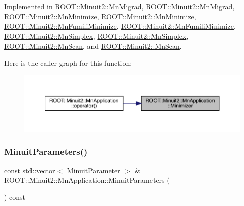 Implemented in \mbox{\hyperlink{classROOT_1_1Minuit2_1_1MnMigrad_a98fa0ce74bf180a287093ac677e8644c}{R\+O\+O\+T\+::\+Minuit2\+::\+Mn\+Migrad}}, \mbox{\hyperlink{classROOT_1_1Minuit2_1_1MnMigrad_a98fa0ce74bf180a287093ac677e8644c}{R\+O\+O\+T\+::\+Minuit2\+::\+Mn\+Migrad}}, \mbox{\hyperlink{classROOT_1_1Minuit2_1_1MnMinimize_a879bb789f98c72f9a90a327fc7bb48fd}{R\+O\+O\+T\+::\+Minuit2\+::\+Mn\+Minimize}}, \mbox{\hyperlink{classROOT_1_1Minuit2_1_1MnMinimize_a879bb789f98c72f9a90a327fc7bb48fd}{R\+O\+O\+T\+::\+Minuit2\+::\+Mn\+Minimize}}, \mbox{\hyperlink{classROOT_1_1Minuit2_1_1MnFumiliMinimize_a96eb0cf96ae7ec874f912b6d2b3e7990}{R\+O\+O\+T\+::\+Minuit2\+::\+Mn\+Fumili\+Minimize}}, \mbox{\hyperlink{classROOT_1_1Minuit2_1_1MnFumiliMinimize_a96eb0cf96ae7ec874f912b6d2b3e7990}{R\+O\+O\+T\+::\+Minuit2\+::\+Mn\+Fumili\+Minimize}}, \mbox{\hyperlink{classROOT_1_1Minuit2_1_1MnSimplex_a8fa3495353e667d85e7dbeaffa94b94c}{R\+O\+O\+T\+::\+Minuit2\+::\+Mn\+Simplex}}, \mbox{\hyperlink{classROOT_1_1Minuit2_1_1MnSimplex_a8fa3495353e667d85e7dbeaffa94b94c}{R\+O\+O\+T\+::\+Minuit2\+::\+Mn\+Simplex}}, \mbox{\hyperlink{classROOT_1_1Minuit2_1_1MnScan_a9bebaf56360ff70aac6f47590227d8b5}{R\+O\+O\+T\+::\+Minuit2\+::\+Mn\+Scan}}, and \mbox{\hyperlink{classROOT_1_1Minuit2_1_1MnScan_a9bebaf56360ff70aac6f47590227d8b5}{R\+O\+O\+T\+::\+Minuit2\+::\+Mn\+Scan}}.

Here is the caller graph for this function\+:\nopagebreak
\begin{figure}[H]
\begin{center}
\leavevmode
\includegraphics[width=350pt]{df/dd5/classROOT_1_1Minuit2_1_1MnApplication_a5a8e1e2658b731b5f4023dd1b1594223_icgraph}
\end{center}
\end{figure}
\mbox{\label{classROOT_1_1Minuit2_1_1MnApplication_a415948149d0f79b43adccc1cb7040e10}} 
\subsubsection{\texorpdfstring{MinuitParameters()}{MinuitParameters()}\hspace{0.1cm}{\footnotesize\ttfamily [1/2]}}
{\footnotesize\ttfamily const std\+::vector$<$ \mbox{\hyperlink{classROOT_1_1Minuit2_1_1MinuitParameter}{Minuit\+Parameter}} $>$ \& R\+O\+O\+T\+::\+Minuit2\+::\+Mn\+Application\+::\+Minuit\+Parameters (\begin{DoxyParamCaption}{ }\end{DoxyParamCaption}) const}

